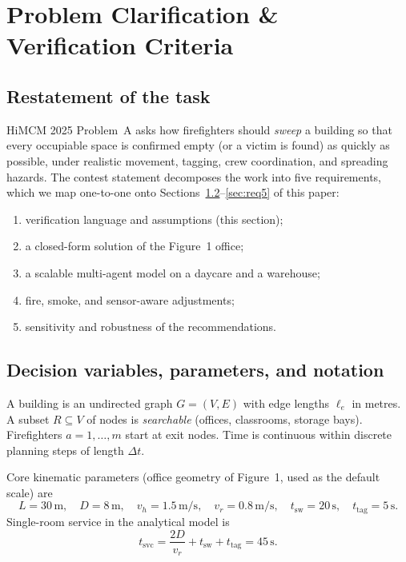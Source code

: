 \documentclass[12pt]{article}
\newcommand{\tsvc}{t_{\mathrm{svc}}}
\newcommand{\tsw}{t_{\mathrm{sw}}}
\newcommand{\ttag}{t_{\mathrm{tag}}}
\newcommand{\whall}{v_{h}}
\newcommand{\vroom}{v_{r}}
\begin{document}
\tableofcontents
\newpage

\section{Problem Clarification \& Verification Criteria}

\subsection{Restatement of the task}

HiMCM 2025 Problem~A asks how firefighters should \emph{sweep} a building so that every
occupiable space is confirmed empty (or a victim is found) as quickly as possible, under
realistic movement, tagging, crew coordination, and spreading hazards. The contest
statement decomposes the work into five requirements, which we map one-to-one onto
Sections~\ref{sec:req1}--\ref{sec:req5} of this paper:
\begin{enumerate}[leftmargin=1.6em,itemsep=0.25em]
  \item verification language and assumptions (this section);
  \item a closed-form solution of the Figure~1 office;
  \item a scalable multi-agent model on a daycare and a warehouse;
  \item fire, smoke, and sensor-aware adjustments;
  \item sensitivity and robustness of the recommendations.
\end{enumerate}

\subsection{Decision variables, parameters, and notation}
\label{sec:req1}

A building is an undirected graph \(G=(V,E)\) with edge lengths \(\ell_e\) in metres.
A subset \(R\subseteq V\) of nodes is \emph{searchable} (offices, classrooms, storage
bays). Firefighters \(a=1,\ldots,m\) start at exit nodes. Time is continuous within
discrete planning steps of length \(\Delta t\).

Core kinematic parameters (office geometry of Figure~1, used as the default scale) are
\[
  L=30\,\mathrm{m},\quad
  D=8\,\mathrm{m},\quad
  \whall=1.5\,\mathrm{m/s},\quad
  \vroom=0.8\,\mathrm{m/s},\quad
  \tsw=20\,\mathrm{s},\quad
  \ttag=5\,\mathrm{s}.
\]
Single-room service in the analytical model is
\begin{equation}
  \label{eq:tsvc}
  \tsvc
  = \frac{2D}{\vroom} + \tsw + \ttag
  = 45\,\mathrm{s}.
\end{equation}
\end{document}
